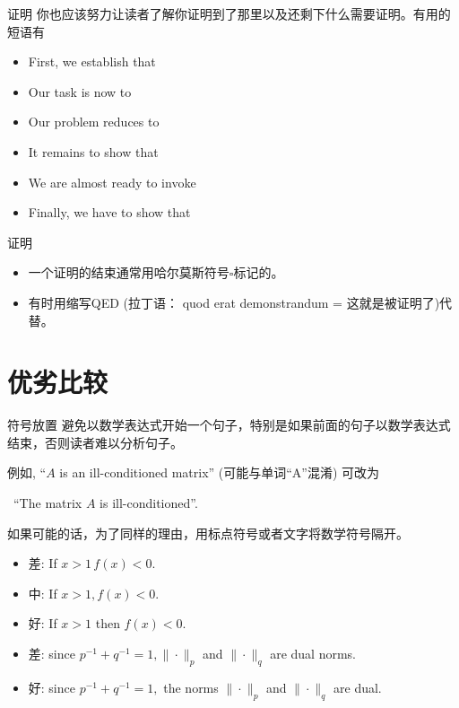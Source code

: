 \documentclass{ctexbeamer}
\begin{document}
\begin{frame}{证明}
	你也应该努力让读者了解你证明到了那里以及还剩下什么需要证明。有用的短语有
	\begin{itemize}
		\item First, we establish that 
		\item Our task is now to 
		\item Our problem reduces to 
		\item It remains to show that 
		\item We are almost ready to invoke 
		\item Finally, we have to show that 
	\end{itemize}
\end{frame}

\begin{frame}{证明}
	\begin{itemize}
		\item 
		一个证明的结束通常用哈尔莫斯符号$\square$标记的。
		\item 
		有时用缩写QED  (拉丁语： quod erat demonstrandum = 这就是被证明了)代替。
	\end{itemize}
\end{frame}


\section{优劣比较}

\begin{frame}{符号放置}
	避免以数学表达式开始一个句子，特别是如果前面的句子以数学表达式结束，否则读者难以分析句子。
	
	例如, ``$A$ is  an ill-conditioned matrix'' 
	(可能与单词``A''混淆)	
	可改为\pause
	
	 \qquad 	 \ ``The matrix $A$ is   ill-conditioned''. 
\vspace{10pt}

如果可能的话，为了同样的理由，用标点符号或者文字将数学符号隔开。

	\begin{itemize}
\item 差: If $x>1 \, f(x)<0$.\pause

\item 中: If $x>1, f(x)<0$. \pause

\item  好: If $x>1$ then $f(x)<0$.
	\end{itemize}

\vspace{10pt}

	\begin{itemize}
	\item 
差: since $p^{-1}+q^{-1}=1,\|\cdot\|_{p}$ and $\|\cdot\|_{q}$ are dual norms. \pause

\item  好: since $p^{-1}+q^{-1}=1,$ the norms $\|\cdot\|_{p}$ and $\|\cdot\|_{q}$ are dual.
	\end{itemize}
\vspace{10pt}
\end{frame}
\end{document}
